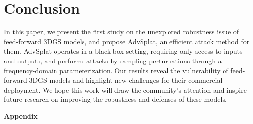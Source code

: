 \documentclass[runningheads]{llncs}
\begin{document}
\section{Conclusion}
In this paper, we present the first study on the unexplored robustness issue of feed-forward 3DGS models, and propose AdvSplat, an efficient attack method for them. AdvSplat operates in a black-box setting, requiring only access to inputs and outputs, and performs attacks by sampling perturbations through a frequency-domain parameterization. Our results reveal the vulnerability of feed-forward 3DGS models and highlight new challenges for their commercial deployment. We hope this work will draw the community’s attention and inspire future research on improving the robustness and defenses of these models.
 
\clearpage  %


%
%



\clearpage
\appendix
\begin{center}
{\LARGE\textbf{Appendix}}
\end{center}

\end{document}
